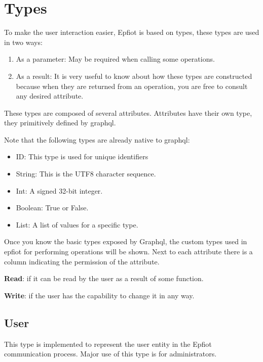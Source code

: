 \section{Types}
\label{makereference5.1}

To make the user interaction easier, Epfiot is based on types, these types are used in two ways:
\begin{enumerate}
    \item As a parameter: May be required when calling some operations.
    \item As a result: It is very useful to know about how these types are constructed because when they are returned from an operation, you are free to consult any desired attribute.
\end{enumerate}

These types are composed of several attributes. Attributes have their own type, they primitively defined by graphql.

Note that the following types are already native to graphql:
\begin{itemize}
    \item ID: This type is used for unique identifiers
    \item String: This is the UTF8 character sequence. 
    \item Int: A signed 32-bit integer.
    \item Boolean: True or False.
    \item List: A list of values for a specific type.
\end{itemize}

Once you know the basic types exposed by Graphql, the custom types used in epfiot for performing operations will be shown. Next to each attribute there is a column indicating the permission of the attribute.

\textbf{Read}: if it can be read by the user as a result of some function.


\textbf{Write}: if the user has the capability to change it in any way.

 
\newpage
\subsection{User}
\label{makereference5.1.1}

This type is implemented to represent the user entity in the Epfiot communication process. Major use of this type is for administrators.


